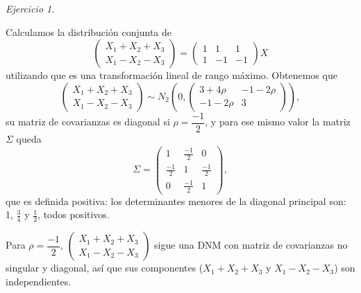 \documentclass[12pt,spanish]{article}
\theoremstyle{definition}
\theoremstyle{remark}
\newtheorem{exercise}{Ejercicio}
\begin{document}
\begin{exercise}
  \begin{enumerate}[a)]
    Calculamos la distribución conjunta de
    \[
      \begin{pmatrix}
        X_1+X_2+X_3 \\
        X_1-X_2-X_3 
      \end{pmatrix}=
      \begin{pmatrix}
        1 & 1 & 1 \\
        1 & -1 & -1 
      \end{pmatrix}X
    \]
    utilizando que es una transformación lineal de rango máximo.
    Obtenemos que \[
      \begin{pmatrix}
        X_1+X_2+X_3 \\
        X_1-X_2-X_3 
      \end{pmatrix}\sim N_2\left(
        0,
        \begin{pmatrix}
          3+4\rho & -1-2\rho\\
          -1-2\rho & 3
      \end{pmatrix}
        \right),
    \]
    su matriz de covarianzas es diagonal si $\rho=\dfrac{-1}{2}$, y
    para ese mismo valor la matriz $\Sigma$ queda
    \[\Sigma=
      \begin{pmatrix}
        1 & \frac{-1}{2} & 0 \\
        \frac{-1}{2} & 1 & \frac{-1}{2} \\
        0 & \frac{-1}{2} & 1
      \end{pmatrix},
    \] que es definida positiva: los determinantes menores de la
    diagonal principal son: 1, $\frac{3}{4}$ y $\frac{1}{2}$, todos
    positivos.

    Para $\rho=\dfrac{-1}{2}$, $\begin{pmatrix}
        X_1+X_2+X_3 \\
        X_1-X_2-X_3 
      \end{pmatrix}$ sigue una DNM con matriz de covarianzas no
      singular y diagonal, así que sus componentes ($X_1+X_2+X_3$
      y $X_1-X_2-X_3$) son independientes.
  \end{enumerate}
\end{exercise}
\end{document}
